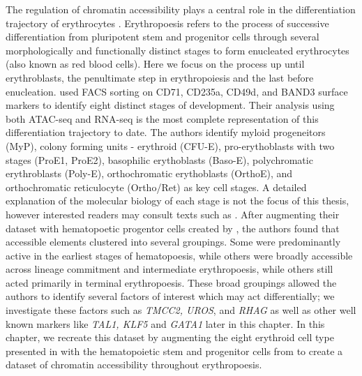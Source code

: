 The regulation of chromatin accessibility plays a central role in the differentiation trajectory of erythrocytes \cite{Hu2016,Schulz2019}. Erythropoesis refers to the process of  successive differentiation from pluripotent stem and progenitor cells through several morphologically and functionally distinct stages to form enucleated erythrocytes (also known as red blood cells). Here we focus on the process up until erythroblasts, the penultimate step in erythropoiesis and the last before enucleation. \textcite{Ludwig2019} used FACS sorting on CD71, CD235a, CD49d, and BAND3 surface markers to identify eight distinct stages of development. Their analysis using both ATAC-seq and RNA-seq is the most complete representation of this differentiation trajectory to date. The authors identify myloid progeneitors (MyP), colony forming units - erythroid (CFU-E), pro-erythoblasts with two stages (ProE1, ProE2), basophilic erythoblasts (Baso-E), polychromatic erythroblasts (Poly-E), orthochromatic erythoblasts (OrthoE), and orthochromatic reticulocyte (Ortho/Ret) as key cell stages. A detailed explanation of the molecular biology of each stage is not the focus of this thesis, however interested readers may consult texts such as \textcite{Sinclair2013}. After augmenting their dataset with hematopoetic progentor cells created by \textcite{Corces2016}, the authors found that accessible elements clustered into several groupings. Some were predominantly active in the earliest stages of hematopoesis, while others were broadly accessible across lineage commitment and intermediate erythropoesis, while others still acted primarily in terminal erythropoesis. 
These broad groupings allowed the authors to identify several factors of interest which may act differentially; we investigate these factors such as \textit{TMCC2, UROS}, and \textit{RHAG} as well as other well known markers like \textit{TAL1, KLF5} and \textit{GATA1} later in this chapter. In this chapter, we recreate this dataset by augmenting the eight erythroid cell type presented in \textcite{Ludwig2019} with the hematopoietic stem and progenitor cells from \textcite{Corces2016} to create a dataset of chromatin accessibility throughout erythropoesis.


